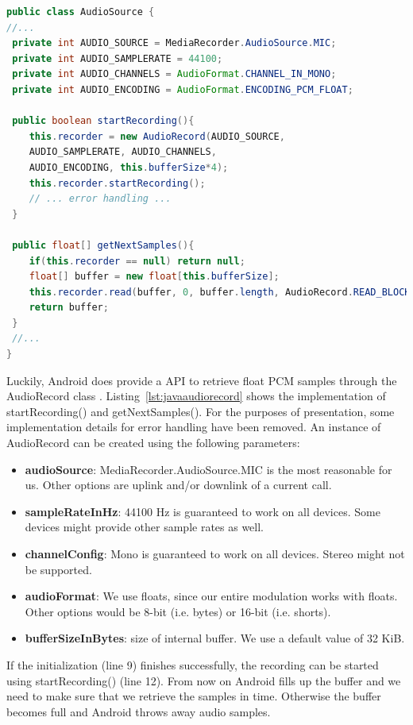 \begin{lstlisting}[label=lst:javaaudiorecord, caption=Retrieving PCM samples from microphone, language=java,]
public class AudioSource {
//...
 private int AUDIO_SOURCE = MediaRecorder.AudioSource.MIC;
 private int AUDIO_SAMPLERATE = 44100;
 private int AUDIO_CHANNELS = AudioFormat.CHANNEL_IN_MONO;
 private int AUDIO_ENCODING = AudioFormat.ENCODING_PCM_FLOAT;

 public boolean startRecording(){
    this.recorder = new AudioRecord(AUDIO_SOURCE,
	AUDIO_SAMPLERATE, AUDIO_CHANNELS,
	AUDIO_ENCODING, this.bufferSize*4);
    this.recorder.startRecording();
    // ... error handling ... 
 }

 public float[] getNextSamples(){
    if(this.recorder == null) return null;
    float[] buffer = new float[this.bufferSize];
    this.recorder.read(buffer, 0, buffer.length, AudioRecord.READ_BLOCKING);
    return buffer;
 }
 //...
}
\end{lstlisting}
Luckily, Android does provide a API to retrieve float PCM samples through the AudioRecord class \cite{androidaudio}. Listing~\ref{lst:javaaudiorecord} shows the implementation of startRecording() and getNextSamples(). For the purposes of presentation, some implementation details for error handling have been removed.  An instance of AudioRecord can be created using the following parameters: 
\begin{itemize}
	\item \textbf{audioSource}: MediaRecorder.AudioSource.MIC is the most reasonable for us. Other options are uplink and/or downlink of a current call. 
	\item \textbf{sampleRateInHz}: 44100 Hz is guaranteed to work on all devices. Some devices might provide other sample rates as well.
	\item \textbf{channelConfig}: Mono is guaranteed to work on all devices. Stereo might not be supported.
	\item \textbf{audioFormat}: We use floats, since our entire modulation works with floats. Other options would be 8-bit (i.e. bytes) or 16-bit (i.e. shorts). 
	\item \textbf{bufferSizeInBytes}: size of internal buffer. We use a default value of 32 KiB. 
\end{itemize}

If the initialization (line 9) finishes successfully, the recording can be started using startRecording() (line 12). From now on Android fills up the buffer and we need to make sure that we retrieve the samples in time. Otherwise the buffer becomes full and Android throws away audio samples. 

